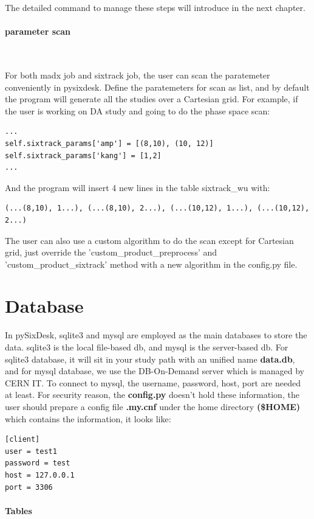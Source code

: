 The detailed command to manage these steps will introduce in the next chapter.

\paragraph{parameter scan}~

For both madx job and sixtrack job, the user can scan the paratemeter conveniently in pysixdesk. Define the paratemeters for scan as list, and by default the program will generate all the studies over a Cartesian grid. For example, if the user is working on DA study and going to do the phase space scan:

\begin{lstlisting}
...
self.sixtrack_params['amp'] = [(8,10), (10, 12)]
self.sixtrack_params['kang'] = [1,2]
...
\end{lstlisting}

And the program will insert 4 new lines in the table sixtrack\_wu with:
\begin{lstlisting}
(...(8,10), 1...), (...(8,10), 2...), (...(10,12), 1...), (...(10,12), 2...)
\end{lstlisting}
The user can also use a custom algorithm to do the scan except for Cartesian grid, just override the 'custom\_product\_preprocess' and 'custom\_product\_sixtrack' method with a new algorithm in the config.py file.

\section{Database}

In pySixDesk, sqlite3 and mysql are employed as the main databases to store the data. sqlite3 is the local file-based db, and mysql is the server-based db. For sqlite3 database, it will sit in your study path with an unified name \textbf{data.db}, and for mysql database, we use the DB-On-Demand server which is managed by CERN IT.
  To connect to mysql, the username, password, host, port are needed at least. For security reason, the \textbf{config.py} doesn't hold these information, the user should prepare a config file \textbf{.my.cnf} under the home directory \textbf{(\$HOME)} which contains the information, it looks like:
\begin{lstlisting}
[client]
user = test1
password = test
host = 127.0.0.1
port = 3306
\end{lstlisting}

\paragraph{Tables}~

